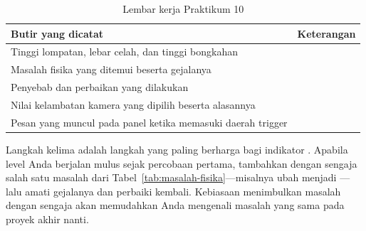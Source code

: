 \begin{table}[htbp]
\centering
\caption{Lembar kerja Praktikum 10}
\label{tab:lembar-praktikum-10}
{\setlength{\tabcolsep}{4pt}\footnotesize%
\begin{tabularx}{\textwidth}{@{}L{4.4cm} Y@{}}
\toprule
\headrow \textbf{Butir yang dicatat} & \textbf{Keterangan} \\
\midrule
Tinggi lompatan, lebar celah, dan tinggi bongkahan & \\[1.2em]
\addlinespace
Masalah fisika yang ditemui beserta gejalanya & \\[2.4em]
\addlinespace
Penyebab dan perbaikan yang dilakukan & \\[2.4em]
\addlinespace
Nilai kelambatan kamera yang dipilih beserta alasannya & \\[1.2em]
\addlinespace
Pesan yang muncul pada panel  ketika memasuki daerah trigger & \\[1.2em]
\bottomrule
\end{tabularx}}
\end{table}

\begin{catatabox}
Langkah kelima adalah langkah yang paling berharga bagi indikator .
Apabila level Anda berjalan mulus sejak percobaan pertama, tambahkan dengan
sengaja salah satu masalah dari Tabel~\ref{tab:masalah-fisika}---misalnya ubah
 menjadi ---lalu amati gejalanya
dan perbaiki kembali. Kebiasaan menimbulkan masalah dengan sengaja akan
memudahkan Anda mengenali masalah yang sama pada proyek akhir nanti.
\end{catatabox}
